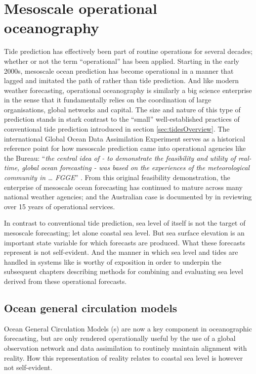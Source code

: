 \section{Mesoscale operational oceanography}
\label{sec:mesoscaleOperational}
Tide prediction has effectively been part of routine operations for several decades; whether or not the term ``operational'' has been applied.
Starting in the early 2000s, mesoscale ocean prediction has become operational in a manner that lagged and imitated the path of \NWP \citep{Harper:2008ub} rather than tide prediction. 
And like modern weather forecasting, operational oceanography is similarly a big science enterprise \citep{Petersen:2012tr} in the sense that it fundamentally relies on the coordination of large organisations, global networks and capital. 
The size and nature of this type of prediction stands in stark contrast to the ``small'' well-established practices of conventional tide prediction introduced in section \ref{sec:tidesOverview}.
The international Global Ocean Data Assimilation Experiment \GODAE{} serves as a historical reference point for how mesoscale prediction came into operational agencies like the Bureau:
``\textit{the central idea of \GODAE{} - to demonstrate the feasibility and utility of real-time, global ocean forecasting - was based on the experiences of the meteorological community in \dots{} FGGE}'' \citep{Bell:2009uv}.
From this original feasibility demonstration, the enterprise of mesoscale ocean forecasting has continued to mature across many national weather agencies; and the Australian case is documented by \cite{10.1080/1755876x.2019.1685834} in reviewing over 15 years of operational services.


In contrast to conventional tide prediction, sea level of itself is not the target of mesoscale forecasting; let alone coastal sea level.   But sea surface elevation is an important state variable for which forecasts are produced.  What these forecasts represent is not self-evident. And the manner in which sea level and tides are handled in systems like \BL{} is worthy of exposition in order to underpin the subsequent chapters describing methods for combining and evaluating sea level derived from these operational forecasts. 
  
\subsection{Ocean general circulation models}
Ocean General Circulation Models (\OGCM{}s) are now a key component in oceanographic forecasting, but are only rendered operationally useful by the use of a global observation network and data assimilation to routinely maintain alignment with reality.
How this representation of reality relates to coastal sea level is however not self-evident.




